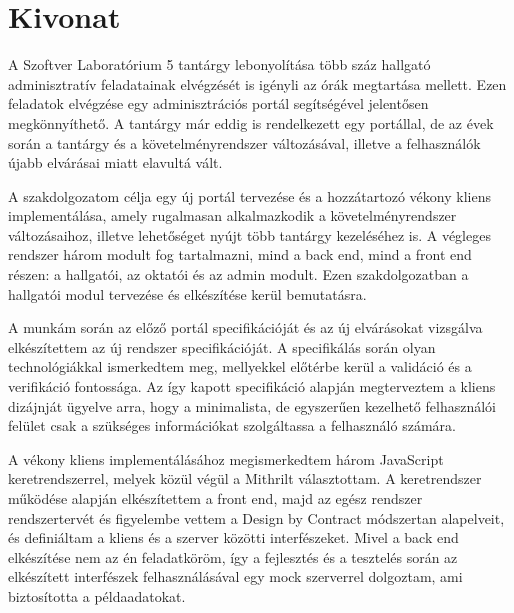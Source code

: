 \setcounter{page}{1}

\hungarianParagraph


\chapter*{Kivonat}

A Szoftver Laboratórium 5 tantárgy lebonyolítása több száz hallgató adminisztratív feladatainak elvégzését is igényli az órák megtartása mellett. Ezen feladatok elvégzése egy adminisztrációs portál segítségével jelentősen megkönnyíthető. A tantárgy már eddig is rendelkezett egy portállal, de az évek során a tantárgy és a követelményrendszer változásával, illetve a felhasználók újabb elvárásai miatt elavultá vált. 

A szakdolgozatom célja egy új portál tervezése és a hozzátartozó vékony kliens implementálása, amely rugalmasan alkalmazkodik a követelményrendszer változásaihoz, illetve lehetőséget nyújt több tantárgy kezeléséhez is. A végleges rendszer három modult fog tartalmazni, mind a back end, mind a front end részen: a hallgatói, az oktatói és az admin modult. Ezen szakdolgozatban a hallgatói modul tervezése és elkészítése kerül bemutatásra.

A munkám során az előző portál specifikációját és az új elvárásokat vizsgálva elkészítettem az új rendszer specifikációját. A specifikálás során olyan technológiákkal ismerkedtem meg, mellyekkel előtérbe kerül a validáció és a verifikáció fontossága. Az így kapott specifikáció alapján megterveztem a kliens dizájnját ügyelve arra, hogy a minimalista, de egyszerűen kezelhető felhasználói felület csak a szükséges információkat szolgáltassa a felhasználó számára.

A vékony kliens implementálásához megismerkedtem három JavaScript keretrendszerrel, melyek közül végül a Mithrilt választottam. A keretrendszer működése alapján elkészítettem a front end, majd az egész rendszer rendszertervét és figyelembe vettem a Design by Contract módszertan alapelveit, és definiáltam a kliens és a szerver közötti interfészeket. Mivel a back end elkészítése nem az én feladatköröm, így a fejlesztés és a tesztelés során az elkészített interfészek felhasználásával egy mock szerverrel dolgoztam, ami biztosította a példaadatokat. 

